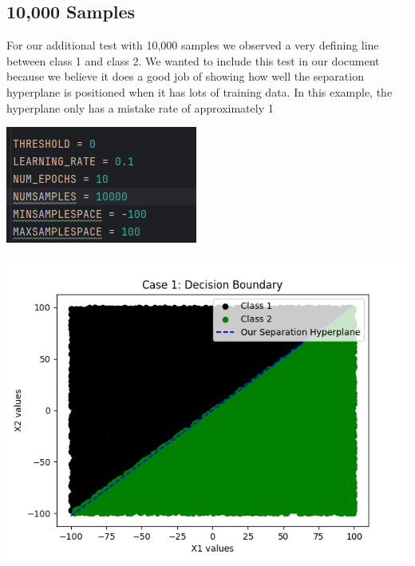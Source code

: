 \documentclass{article}
\begin{document}
\subsection{10,000 Samples}

For our additional test with 10,000 samples we observed a very defining line between class 1 and class 2. We wanted to include this test in our document because we believe it does a good job of showing how well the separation hyperplane is positioned when it has lots of training data. In this example, the hyperplane only has a mistake rate of approximately 1%

\begin{center}
\includegraphics[scale=0.75]{../figs/P2.1.png}\\
\end{center}

\begin{center}
\includegraphics[scale=0.75]{../figs/P2.2.png}\\
\end{center}
\end{document}
